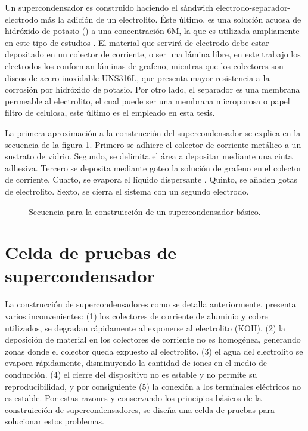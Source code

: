 Un supercondensador es construido haciendo el sándwich electrodo-separador-electrodo más la adición de un electrolito. Éste último, es una solución acuosa de hidróxido de potasio () a una concentración 6M, la que es utilizada ampliamente en este tipo de estudios \citep{Frackowiak2001}.  El material que servirá de electrodo debe estar depositado en un colector de corriente, o ser una lámina libre, en este trabajo los electrodos los conforman láminas de grafeno, mientras que los colectores son discos de acero inoxidable UNS316L, que presenta mayor resistencia a la corrosión por hidróxido de potasio. Por otro lado, el separador es una membrana permeable al electrolito, el cual puede ser una membrana microporosa o papel filtro de celulosa, este último es el empleado en esta tesis.

La primera aproximación a la construcción del supercondensador se explica en la secuencia de la figura \ref{fig:SC_process}. Primero se adhiere el colector de corriente metálico a un sustrato de vidrio. Segundo, se delimita el área a depositar mediante una cinta adhesiva. Tercero se deposita mediante goteo la solución de grafeno en el colector de corriente. Cuarto, se evapora el líquido dispersante . Quinto, se añaden gotas de electrolito. Sexto, se cierra el sistema con un segundo electrodo.

\begin{figure}[h!]
	\centering
	\caption{Secuencia para la construicción de un supercondensador básico.}
	\label{fig:SC_process}
\end{figure}

\section{Celda de pruebas de supercondensador}
La construcción de supercondensadores como se detalla anteriormente, presenta varios inconvenientes: (1) los colectores de corriente de aluminio y cobre utilizados, se degradan rápidamente al exponerse al electrolito (KOH). (2) la deposición de material en los colectores de corriente no es homogénea, generando zonas donde el colector queda expuesto al electrolito. (3) el agua del electrolito se evapora rápidamente, disminuyendo la cantidad de iones en el medio de conducción. (4) el cierre del dispositivo no es estable y no permite su reproducibilidad, y por consiguiente (5) la conexión a los terminales eléctricos no es estable. Por estas razones y conservando los principios básicos de la construicción de supercondensadores, se diseña una celda de pruebas para solucionar estos problemas.

